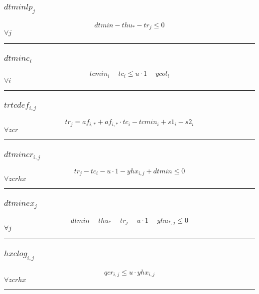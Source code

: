 \documentclass[11pt]{article}
\begin{document}
\subsubsection*{$dtminlp_{j}$}
\begin{equation}
dtmin - thu_{*} - tr_{j} \leq 0
\end{equation}
\hfill
$
\forall j
$\vspace{5pt}
\hrule
\subsubsection*{$dtminc_{i}$}
\begin{equation}
tcmin_{i} - tc_{i} \leq u \cdot 1 - ycol_{i}
\end{equation}
\hfill
$
\forall i
$\vspace{5pt}
\hrule
\subsubsection*{$trtcdef_{i,j}$}
\begin{equation}
tr_{j} = af_{i,*} + af_{i,*} \cdot tc_{i} - tcmin_{i} + s1_{i} - s2_{i}
\end{equation}
\hfill
$
\forall zcr
$\vspace{5pt}
\hrule
\subsubsection*{$dtmincr_{i,j}$}
\begin{equation}
tr_{j} - tc_{i} - u \cdot 1 - yhx_{i,j} + dtmin \leq 0
\end{equation}
\hfill
$
\forall zcrhx
$\vspace{5pt}
\hrule
\subsubsection*{$dtminex_{j}$}
\begin{equation}
dtmin - thu_{*} - tr_{j} - u \cdot 1 - yhu_{*,j} \leq 0
\end{equation}
\hfill
$
\forall j
$\vspace{5pt}
\hrule
\subsubsection*{$hxclog_{i,j}$}
\begin{equation}
qcr_{i,j} \leq u \cdot yhx_{i,j}
\end{equation}
\hfill
$
\forall zcrhx
$\vspace{5pt}
\hrule
\end{document}
